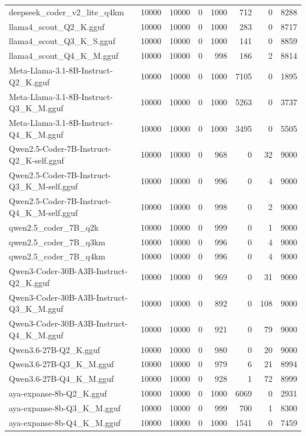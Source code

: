 \begin{table}[htbp]
{\begin{tabular}{lrrrrrrr}
    deepseek\_coder\_v2\_lite\_q4km & 10000 & 10000 & 0 & 1000 & 712 & 0 & 8288 \\
    llama4\_scout\_Q2\_K.gguf & 10000 & 10000 & 0 & 1000 & 283 & 0 & 8717 \\
    llama4\_scout\_Q3\_K\_S.gguf & 10000 & 10000 & 0 & 1000 & 141 & 0 & 8859 \\
    llama4\_scout\_Q4\_K\_M.gguf & 10000 & 10000 & 0 & 998 & 186 & 2 & 8814 \\
    Meta-Llama-3.1-8B-Instruct-Q2\_K.gguf & 10000 & 10000 & 0 & 1000 & 7105 & 0 & 1895 \\
    Meta-Llama-3.1-8B-Instruct-Q3\_K\_M.gguf & 10000 & 10000 & 0 & 1000 & 5263 & 0 & 3737 \\
    Meta-Llama-3.1-8B-Instruct-Q4\_K\_M.gguf & 10000 & 10000 & 0 & 1000 & 3495 & 0 & 5505 \\
    Qwen2.5-Coder-7B-Instruct-Q2\_K-self.gguf & 10000 & 10000 & 0 & 968 & 0 & 32 & 9000 \\
    Qwen2.5-Coder-7B-Instruct-Q3\_K\_M-self.gguf & 10000 & 10000 & 0 & 996 & 0 & 4 & 9000 \\
    Qwen2.5-Coder-7B-Instruct-Q4\_K\_M-self.gguf & 10000 & 10000 & 0 & 998 & 0 & 2 & 9000 \\
    qwen2.5\_coder\_7B\_q2k & 10000 & 10000 & 0 & 999 & 0 & 1 & 9000 \\
    qwen2.5\_coder\_7B\_q3km & 10000 & 10000 & 0 & 996 & 0 & 4 & 9000 \\
    qwen2.5\_coder\_7B\_q4km & 10000 & 10000 & 0 & 996 & 0 & 4 & 9000 \\
    Qwen3-Coder-30B-A3B-Instruct-Q2\_K.gguf & 10000 & 10000 & 0 & 969 & 0 & 31 & 9000 \\
    Qwen3-Coder-30B-A3B-Instruct-Q3\_K\_M.gguf & 10000 & 10000 & 0 & 892 & 0 & 108 & 9000 \\
    Qwen3-Coder-30B-A3B-Instruct-Q4\_K\_M.gguf & 10000 & 10000 & 0 & 921 & 0 & 79 & 9000 \\
    Qwen3.6-27B-Q2\_K.gguf & 10000 & 10000 & 0 & 980 & 0 & 20 & 9000 \\
    Qwen3.6-27B-Q3\_K\_M.gguf & 10000 & 10000 & 0 & 979 & 6 & 21 & 8994 \\
    Qwen3.6-27B-Q4\_K\_M.gguf & 10000 & 10000 & 0 & 928 & 1 & 72 & 8999 \\
    aya-expanse-8b-Q2\_K.gguf & 10000 & 10000 & 0 & 1000 & 6069 & 0 & 2931 \\
    aya-expanse-8b-Q3\_K\_M.gguf & 10000 & 10000 & 0 & 999 & 700 & 1 & 8300 \\
    aya-expanse-8b-Q4\_K\_M.gguf & 10000 & 10000 & 0 & 1000 & 1541 & 0 & 7459 \\

\end{tabular}}
\end{table}
